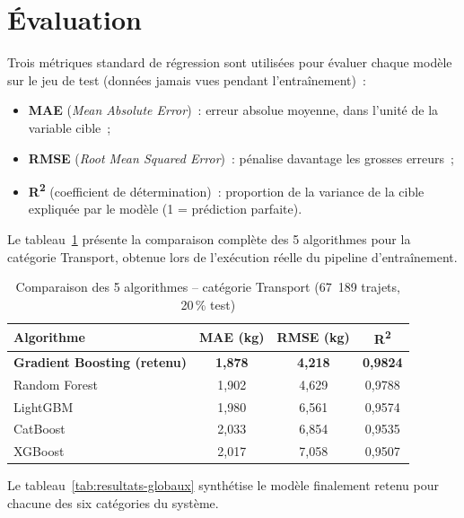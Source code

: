 \section{Évaluation}

Trois métriques standard de régression sont utilisées pour évaluer chaque modèle sur le jeu de test (données jamais vues pendant l'entraînement)~:

\begin{itemize}[label=\textbullet,font=\normalsize]
    \item \textbf{MAE} (\textit{Mean Absolute Error})~: erreur absolue moyenne, dans l'unité de la variable cible~;
    \item \textbf{RMSE} (\textit{Root Mean Squared Error})~: pénalise davantage les grosses erreurs~;
    \item \textbf{R\textsuperscript{2}} (coefficient de détermination)~: proportion de la variance de la cible expliquée par le modèle (1 = prédiction parfaite).
\end{itemize}

Le tableau~\ref{tab:comparaison-algos} présente la comparaison complète des 5 algorithmes pour la catégorie Transport, obtenue lors de l'exécution réelle du pipeline d'entraînement.

\begin{table}[H]
\centering
\caption{Comparaison des 5 algorithmes -- catégorie Transport (67~189 trajets, 20\,\% test)}
\label{tab:comparaison-algos}
\begin{tabular}{|l|c|c|c|}
\hline
\rowcolor{isiBlue!15}
\textbf{Algorithme} & \textbf{MAE (kg)} & \textbf{RMSE (kg)} & \textbf{R\textsuperscript{2}} \\
\hline
\textbf{Gradient Boosting (retenu)} & \textbf{1,878} & \textbf{4,218} & \textbf{0,9824} \\ \hline
Random Forest & 1,902 & 4,629 & 0,9788 \\ \hline
LightGBM & 1,980 & 6,561 & 0,9574 \\ \hline
CatBoost & 2,033 & 6,854 & 0,9535 \\ \hline
XGBoost & 2,017 & 7,058 & 0,9507 \\ \hline
\end{tabular}
\end{table}

Le tableau~\ref{tab:resultats-globaux} synthétise le modèle finalement retenu pour chacune des six catégories du système.

